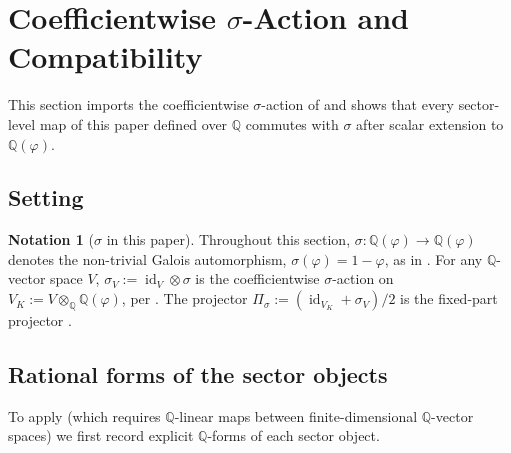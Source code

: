 \documentclass[11pt, a4paper]{amsart}
\theoremstyle{definition}
\newtheorem{notation}[theorem]{Notation}
\newcommand{\Q}{\mathbb{Q}}
\newcommand{\id}{\operatorname{id}}
\begin{document}
\section{Coefficientwise $\sigma$-Action and Compatibility}
\label{sec:sigma-compat}

This section imports the coefficientwise $\sigma$-action of
\cite{SigmaRationality} and shows that every sector-level map of
this paper defined over $\Q$ commutes with $\sigma$ after scalar
extension to $\Q(\varphi)$.

\subsection{Setting}

\begin{notation}[$\sigma$ in this paper]
\label{not:sigma-P2}
Throughout this section, $\sigma \colon \Q(\varphi) \to \Q(\varphi)$
denotes the non-trivial Galois automorphism,
$\sigma(\varphi) = 1 - \varphi$, as in
\cite[Def.~2.2]{SigmaRationality}. For any $\Q$-vector space $V$,
$\sigma_V := \id_V \otimes \sigma$ is the coefficientwise
$\sigma$-action on $V_K := V \otimes_\Q \Q(\varphi)$, per
\cite[Def.~2.5]{SigmaRationality}. The projector
$\Pi_\sigma := (\id_{V_K} + \sigma_V)/2$ is the fixed-part
projector \cite[Def.~4.1]{SigmaRationality}.
\end{notation}

\subsection{Rational forms of the sector objects}
\label{subsec:Q-forms}

To apply \cite[Thm.~4.5]{SigmaRationality} (which requires
$\Q$-linear maps between finite-dimensional $\Q$-vector spaces) we
first record explicit $\Q$-forms of each sector object.
\end{document}
